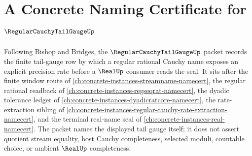 \chapter{A Concrete Naming Certificate for $\RegularCauchyTailGaugeUp$}
\label{ch:concrete-instances-regular-cauchy-tail-gauge-namecert}

Following Bishop and Bridges, the $\RegularCauchyTailGaugeUp$ packet records the finite tail-gauge row by which a regular rational Cauchy name exposes an explicit precision rate before a $\RealUp$ consumer reads the seal. It sits after the finite window route of \autoref{ch:concrete-instances-streamname-namecert}, the regular rational readback of \autoref{ch:concrete-instances-regseqrat-namecert}, the dyadic tolerance ledger of \autoref{ch:concrete-instances-dyadicratcore-namecert}, the rate-extraction sibling of \autoref{ch:concrete-instances-regular-cauchy-rate-extraction-namecert}, and the terminal real-name seal of \autoref{ch:concrete-instances-real-namecert}. The packet names the displayed tail gauge itself; it does not assert quotient stream equality, host Cauchy completeness, selected moduli, countable choice, or ambient $\RealUp$ completeness.

